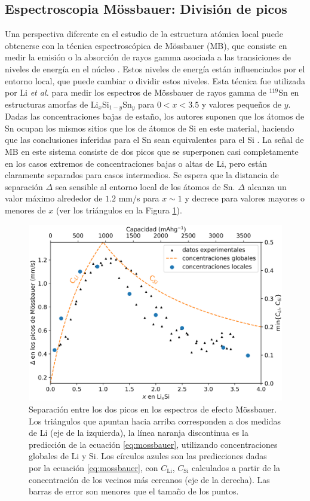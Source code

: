 \subsection{Espectroscopia Mössbauer: División de picos}

Una perspectiva diferente en el estudio de la estructura atómica local puede 
obtenerse con la técnica espectroscópica de Mössbauer (MB), que consiste en medir 
la emisión o la absorción de rayos gamma asociada a las transiciones de niveles
de energía en el núcleo \cite{long2013}. Estos niveles de energía están 
influenciados por el entorno local, que puede cambiar o dividir estos niveles.
Esta técnica fue utilizada por Li \textit{et al.} \cite{li2009} para medir los espectros de 
Mössbauer de rayos gamma de $^{119}$Sn en estructuras amorfas de 
Li$_x$Si$_{1-y}$Sn$_y$ para $0 < x < 3.5$ y valores pequeños de $y$.
Dadas las concentraciones bajas de estaño, los autores suponen que los átomos de Sn
ocupan los mismos sitios que los de átomos de Si en este material, haciendo que 
las conclusiones inferidas para el Sn sean equivalentes para el Si 
\cite{hatchard2005}. La señal de MB en este sistema consiste de dos picos que se superponen casi 
completamente en los casos extremos de concentraciones bajas o altas de Li, 
pero están claramente separados para casos intermedios. Se espera que la distancia de separación
$\Delta$ sea sensible al entorno local de los átomos de Sn. $\Delta$
alcanza un valor máximo alrededor de $1.2$ mm/s para $x \sim 1$ y decrece para 
valores mayores o menores de $x$ (ver los triángulos en la Figura \ref{fig:mossbauer}).
\begin{figure}[h!]
    \centering
    \includegraphics[width=.7\textwidth]{Silicio/prediccion/resultados/mossbauer/mossbauer.png}
    \caption{Separación entre los dos picos en los espectros de efecto 
    Mössbauer. Los triángulos que apuntan hacia arriba corresponden a dos 
    medidas de Li  \cite{li2009} (eje de la izquierda), la línea naranja discontinua es la 
    predicción de la ecuación \ref{eq:mossbauer}, utilizando concentraciones 
    globales de Li y Si. Los círculos azules son las predicciones dadas 
    por la ecuación \ref{eq:mossbauer}, con $C_{\text{Li}}$, $C_{\text{Si}}$ 
    calculados a partir de la concentración de los vecinos más cercanos (eje de 
    la derecha). Las barras de error son menores que el tamaño de los puntos.}
    \label{fig:mossbauer}
\end{figure}
